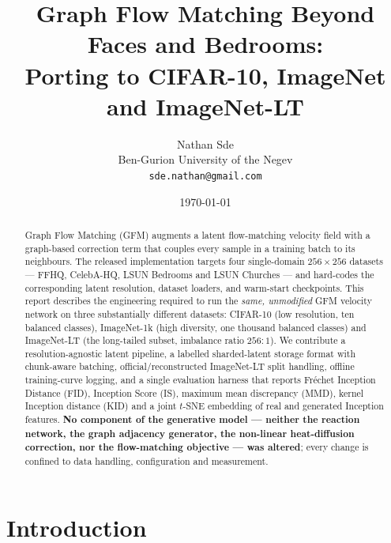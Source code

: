 \documentclass[11pt]{article}
\title{\bf Graph Flow Matching Beyond Faces and Bedrooms:\\
Porting \GFM{} to CIFAR-10, ImageNet and ImageNet-LT}
\author{%
  Nathan Sde\\
  \small Ben-Gurion University of the Negev\\
  \small \texttt{sde.nathan@gmail.com}
}
\date{\today}
\newcommand{\GFM}{\textsc{GFM}}
\newcommand{\safeinput}[1]{\IfFileExists{#1}{}{\textit{(pending)}}}
\begin{document}
\maketitle

\begin{abstract}
Graph Flow Matching (\GFM{}) augments a latent flow-matching velocity field with
a graph-based correction term that couples every sample in a training batch to
its neighbours. The released implementation targets four
single-domain $256\times256$ datasets --- FFHQ, CelebA-HQ, LSUN Bedrooms and LSUN
Churches --- and hard-codes the corresponding latent resolution, dataset
loaders, and warm-start checkpoints. This report describes the engineering
required to run the \emph{same, unmodified} \GFM{} velocity network on three
substantially different datasets: CIFAR-10 (low resolution, ten balanced
classes), ImageNet-1k (high diversity, one thousand balanced classes) and
ImageNet-LT (the long-tailed subset, imbalance ratio $256{:}1$). We contribute a
resolution-agnostic latent pipeline, a labelled sharded-latent storage format
with chunk-aware batching, official/reconstructed ImageNet-LT split handling,
offline training-curve logging, and a single evaluation harness that reports
Fr\'echet Inception Distance (FID), Inception Score (IS), maximum mean
discrepancy (MMD), kernel Inception distance (KID) and a joint $t$-SNE embedding
of real and generated Inception features. \textbf{No component of the generative
model --- neither the reaction network, the graph adjacency generator, the
non-linear heat-diffusion correction, nor the flow-matching objective --- was
altered};  every change is confined to data handling, configuration and
measurement.
\end{abstract}

\safeinput{generated/status.tex}

\section{Introduction}
\label{sec:intro}
\end{document}
